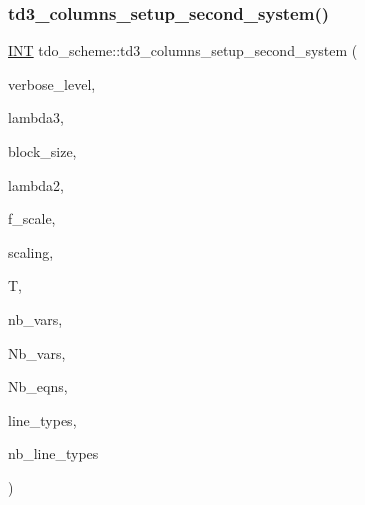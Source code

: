 \subsubsection{\texorpdfstring{td3\+\_\+columns\+\_\+setup\+\_\+second\+\_\+system()}{td3\_columns\_setup\_second\_system()}}
{\footnotesize\ttfamily \mbox{\hyperlink{galois_8h_a09fddde158a3a20bd2dcadb609de11dc}{I\+NT}} tdo\+\_\+scheme\+::td3\+\_\+columns\+\_\+setup\+\_\+second\+\_\+system (\begin{DoxyParamCaption}\item[{\mbox{\hyperlink{galois_8h_a09fddde158a3a20bd2dcadb609de11dc}{I\+NT}}}]{verbose\+\_\+level,  }\item[{\mbox{\hyperlink{galois_8h_a09fddde158a3a20bd2dcadb609de11dc}{I\+NT}}}]{lambda3,  }\item[{\mbox{\hyperlink{galois_8h_a09fddde158a3a20bd2dcadb609de11dc}{I\+NT}}}]{block\+\_\+size,  }\item[{\mbox{\hyperlink{galois_8h_a09fddde158a3a20bd2dcadb609de11dc}{I\+NT}}}]{lambda2,  }\item[{\mbox{\hyperlink{galois_8h_a09fddde158a3a20bd2dcadb609de11dc}{I\+NT}}}]{f\+\_\+scale,  }\item[{\mbox{\hyperlink{galois_8h_a09fddde158a3a20bd2dcadb609de11dc}{I\+NT}}}]{scaling,  }\item[{\mbox{\hyperlink{classtdo__data}{tdo\+\_\+data}} \&}]{T,  }\item[{\mbox{\hyperlink{galois_8h_a09fddde158a3a20bd2dcadb609de11dc}{I\+NT}}}]{nb\+\_\+vars,  }\item[{\mbox{\hyperlink{galois_8h_a09fddde158a3a20bd2dcadb609de11dc}{I\+NT}} \&}]{Nb\+\_\+vars,  }\item[{\mbox{\hyperlink{galois_8h_a09fddde158a3a20bd2dcadb609de11dc}{I\+NT}} \&}]{Nb\+\_\+eqns,  }\item[{\mbox{\hyperlink{galois_8h_a09fddde158a3a20bd2dcadb609de11dc}{I\+NT}} $\ast$\&}]{line\+\_\+types,  }\item[{\mbox{\hyperlink{galois_8h_a09fddde158a3a20bd2dcadb609de11dc}{I\+NT}} \&}]{nb\+\_\+line\+\_\+types }\end{DoxyParamCaption})}

\mbox{\label{classtdo__scheme_a55af718b5b7bbdc293a935f00c0814d6}} 
